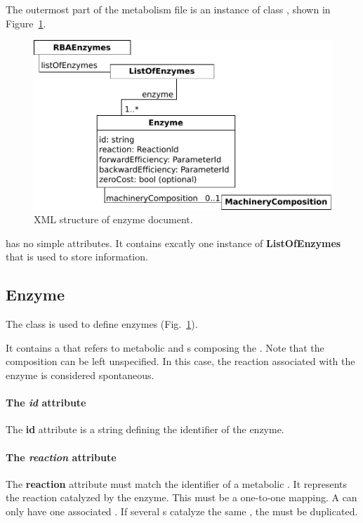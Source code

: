 The outermost part of the metabolism file is an instance of class
\rbaenzymes, shown in Figure~\ref{fig:enzymes_doc}.

\begin{figure}
  \centering
  \includegraphics[scale=0.8]{figures/enzymes_doc}
  \caption{XML structure of enzyme document.}
\label{fig:enzymes_doc}
\end{figure}

\rbaenzymes{} has no simple attributes.
It contains excatly one instance of \textbf{ListOfEnzymes} that is used
to store \enzyme{} information.


\subsection{Enzyme}
\label{sec:enzyme}

The \enzyme{} class is used to define enzymes
(Fig.~\ref{fig:enzymes_doc}).

It contains a \machinerycomposition{} that refers to metabolic \species{}
and \macromolecule{}s composing the \enzyme{}.
Note that the composition can be left unspecified.
In this case, the reaction associated with the enzyme is considered spontaneous.

\paragraph{The \textit{id} attribute}
The \textbf{id} attribute is a string defining the identifier of
the enzyme.

\paragraph{The \textit{reaction} attribute}
The \textbf{reaction} attribute must match the identifier of a metabolic
\reaction.
It represents the reaction catalyzed by the enzyme.
This must be a one-to-one mapping.
A \reaction{} can only have one associated \enzyme{}.
If several \enzyme{}s catalyze the same \reaction{},
the \reaction{} must be duplicated.


